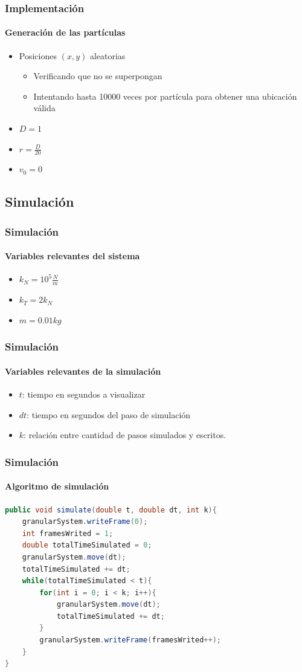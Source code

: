 \documentclass[hyperref={pdfpagelayout=SinglePage}]{beamer}
\begin{document}
\begin{frame}
\frametitle{Implementación}
\framesubtitle{Generación de las partículas}
\begin{itemize}
	\item Posiciones $(x,y)$ aleatorias
	\begin{itemize}
		\item Verificando que no se superpongan
		\item Intentando hasta 10000 veces por partícula para obtener una ubicación válida 
	\end{itemize}
	\item $D = 1$
	\item $r = \frac{D}{20}$
	\item $v_{0} = 0$
\end{itemize}
\end{frame}

\subsection{Simulación}

\begin{frame}
\frametitle{Simulación}
\framesubtitle{Variables relevantes del sistema}
\begin{itemize}
	\item $k_{N} = 10^5 \frac{N}{m}$
	\item $k_{T} = 2 k_{N}$
	\item $m = 0.01 kg$
\end{itemize}
\end{frame}

\begin{frame}
\frametitle{Simulación}
\framesubtitle{Variables relevantes de la simulación}
\begin{itemize}
	\item $t$: tiempo en segundos a visualizar
	\item $dt$: tiempo en segundos del paso de simulación
	\item $k$: relación entre cantidad de pasos simulados y escritos.
\end{itemize}
\end{frame}

\begin{frame}[fragile]
\frametitle{Simulación}
\framesubtitle{Algoritmo de simulación}
\begin{lstlisting}[language=Java, caption = Algoritmo de simulación]
public void simulate(double t, double dt, int k){
	granularSystem.writeFrame(0);
    int framesWrited = 1;
    double totalTimeSimulated = 0;
    granularSystem.move(dt);
    totalTimeSimulated += dt;
    while(totalTimeSimulated < t){
		for(int i = 0; i < k; i++){
			granularSystem.move(dt);
        	totalTimeSimulated += dt;
    	}
    	granularSystem.writeFrame(framesWrited++);
    }
}
\end{lstlisting}
\end{frame}
\end{document}
